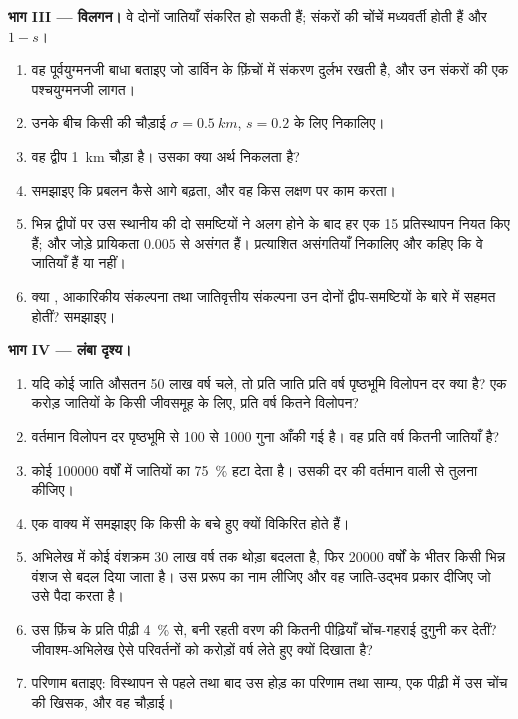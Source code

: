 \begin{problem}
\medskip
\noindent\textbf{भाग III --- विलगन।}
वे दोनों जातियाँ संकरित हो सकती हैं; संकरों की चोंचें मध्यवर्ती होती हैं और
 $1 - s$।
\begin{enumerate}[resume]
  \item वह पूर्वयुग्मनजी बाधा बताइए जो डार्विन के फ़िंचों में संकरण
        दुर्लभ रखती है, और उन संकरों की एक पश्चयुग्मनजी
        लागत।
  \item उनके बीच किसी  की चौड़ाई $\sigma
        = \qty{0.5}{km}$, $s = 0.2$ के लिए निकालिए।
  \item वह द्वीप \qty{1}{km} चौड़ा है। उसका क्या अर्थ निकलता है?
  \item समझाइए कि प्रबलन कैसे आगे बढ़ता, और वह किस लक्षण पर
        काम करता।
  \item भिन्न द्वीपों पर उस स्थानीय की दो समष्टियों ने अलग होने के बाद
        हर एक 15 प्रतिस्थापन नियत किए हैं; और जोड़े प्रायिकता $0.005$ से
        असंगत हैं। प्रत्याशित असंगतियाँ निकालिए और कहिए कि वे जातियाँ हैं या नहीं।
  \item क्या , आकारिकीय
        संकल्पना तथा जातिवृत्तीय संकल्पना उन दोनों द्वीप-समष्टियों के बारे में
        सहमत होतीं? समझाइए।
\end{enumerate}

\medskip
\noindent\textbf{भाग IV --- लंबा दृश्य।}
\begin{enumerate}[resume]
  \item यदि कोई जाति औसतन 50 लाख वर्ष चले, तो प्रति जाति प्रति वर्ष
        पृष्ठभूमि विलोपन दर क्या है? एक करोड़ जातियों के किसी
        जीवसमूह के लिए, प्रति वर्ष कितने विलोपन?
  \item वर्तमान विलोपन दर पृष्ठभूमि से 100 से 1000
        गुना आँकी गई है। वह प्रति वर्ष कितनी जातियाँ है?
  \item कोई  \num{100000} वर्षों में जातियों का
        \qty{75}{\%} हटा देता है। उसकी दर की वर्तमान वाली से तुलना कीजिए।
  \item एक वाक्य में समझाइए कि किसी  के बचे हुए क्यों
        विकिरित होते हैं।
  \item अभिलेख में कोई वंशक्रम 30 लाख वर्ष तक थोड़ा बदलता है,
        फिर \num{20000} वर्षों के भीतर किसी भिन्न वंशज से बदल दिया जाता है।
        उस प्ररूप का नाम लीजिए और वह जाति-उद्भव प्रकार दीजिए जो उसे पैदा करता है।
  \item उस फ़िंच के प्रति पीढ़ी \qty{4}{\%} से, बनी रहती वरण की कितनी
        पीढ़ियाँ चोंच-गहराई दुगुनी कर देतीं?
        जीवाश्म-अभिलेख ऐसे परिवर्तनों को करोड़ों वर्ष लेते हुए क्यों दिखाता है?
  \item परिणाम बताइए: विस्थापन से पहले तथा बाद उस होड़ का
        परिणाम तथा साम्य, एक पीढ़ी में उस चोंच की खिसक,
        और वह  चौड़ाई।
\end{enumerate}
\end{problem}
